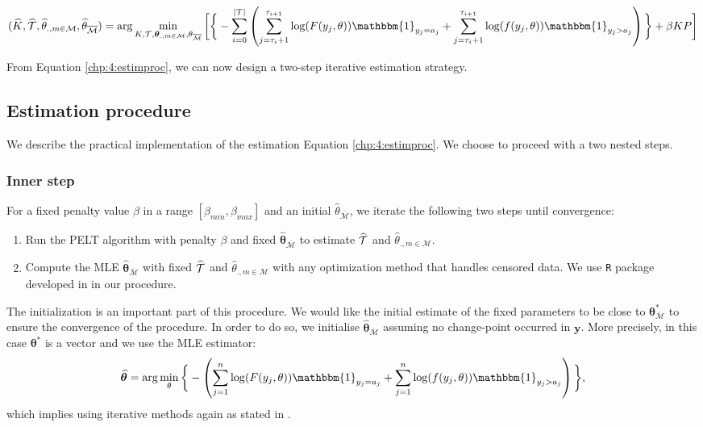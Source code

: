 \begin{dmath}\label{chp:4:estimproc}
(\widehat{K},\widehat{\TT},\widehat{\theta}_{.,m\in\mathcal{M}},\widehat{\theta}_{\overline{\mathcal{M}}}) = \arg\min_{K,\TT,\bm \theta_{.,m\in\mathcal{M}},\theta_{\overline{\mathcal{M}}}}\bigg[\bigg\{ - \sum_{i=0}^{\lvert \TT \rvert}  \left(\sum_{j=\tau_i+1}^{\tau_{i+1}}\log(F(y_j,\theta))\mathbbm{1}_{y_j=a_j}+\sum_{j=\tau_i+1}^{\tau_{i+1}}\log(f(y_j,\theta))\mathbbm{1}_{y_j>a_j}\right)\bigg\}+\beta KP \bigg]
\end{dmath}

From Equation \eqref{chp:4:estimproc}, we can now design a two-step iterative estimation strategy.

\subsection{Estimation procedure}


We describe the practical implementation of the estimation Equation \ref{chp:4:estimproc}. We choose to proceed with a two nested steps.

\subsubsection{Inner step}

For a fixed penalty value $\beta$ in a range $[\beta_{min},\beta_{max}]$ and an initial $\widehat{\theta}_{\overline{\mathcal{M}}}$, we iterate the following two steps until convergence: 
\begin{enumerate}
\item Run the PELT algorithm with penalty $\beta$ and fixed $\widehat{\bm\theta}_{{\overline{\mathcal{M}}}}$ to estimate $\widehat{{\mathcal T}}$ and $\widehat{\theta}_{.,m\in\mathcal{M}}$.
\item Compute the MLE $\widehat{\bm\theta}_{{\overline{\mathcal{M}}}}$ with fixed $\widehat{{\mathcal T}}$ and $\widehat{\theta}_{.,m\in\mathcal{M}}$ with any optimization method that handles censored data. We use \texttt{R} package developed in \cite{delignette2015} in our procedure.  
\end{enumerate} 

The initialization is an important part of this procedure. We would like the initial estimate of the fixed parameters to be close to $\bm\theta^*_{{\overline{\mathcal{M}}}}$ to ensure the convergence of the procedure. In order to do so, we initialise $\widehat{\bm\theta}_{\overline{\mathcal{M}}}$ assuming no change-point occurred in $\bm y$.  More precisely, in this case $\bm\theta^*$ is a vector and we use the MLE estimator:  
\begin{equation}\label{chp:4:init}
\widehat{\bm\theta} = \arg\min_{\theta}\bigg\{ - \left(\sum_{j=1}^{n}\log(F(y_j,\theta))\mathbbm{1}_{y_j=a_j}+\sum_{j=1}^{n}\log(f(y_j,\theta))\mathbbm{1}_{y_j>a_j}\right)\bigg\},
\end{equation}   
which implies using iterative methods again as stated in \cite{cohen1965maximum}.


